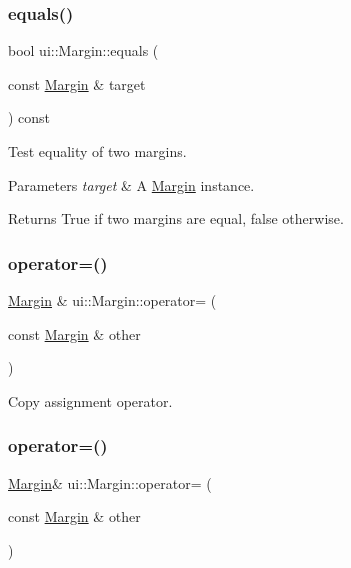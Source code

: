 \subsubsection{\texorpdfstring{equals()}{equals()}\hspace{0.1cm}{\footnotesize\ttfamily [2/2]}}
{\footnotesize\ttfamily bool ui\+::\+Margin\+::equals (\begin{DoxyParamCaption}\item[{const \hyperlink{classui_1_1Margin}{Margin} \&}]{target }\end{DoxyParamCaption}) const}

Test equality of two margins. 
\begin{DoxyParams}{Parameters}
{\em target} & A \hyperlink{classui_1_1Margin}{Margin} instance. \\
\hline
\end{DoxyParams}
\begin{DoxyReturn}{Returns}
True if two margins are equal, false otherwise. 
\end{DoxyReturn}
\mbox{\label{classui_1_1Margin_aa9b38e77be87eb7cecaf3be42619b6ff}} 
\subsubsection{\texorpdfstring{operator=()}{operator=()}\hspace{0.1cm}{\footnotesize\ttfamily [1/2]}}
{\footnotesize\ttfamily \hyperlink{classui_1_1Margin}{Margin} \& ui\+::\+Margin\+::operator= (\begin{DoxyParamCaption}\item[{const \hyperlink{classui_1_1Margin}{Margin} \&}]{other }\end{DoxyParamCaption})}

Copy assignment operator. \mbox{\label{classui_1_1Margin_a3e47b96ba1dfce60abbc81f0bc9d486e}} 
\subsubsection{\texorpdfstring{operator=()}{operator=()}\hspace{0.1cm}{\footnotesize\ttfamily [2/2]}}
{\footnotesize\ttfamily \hyperlink{classui_1_1Margin}{Margin}\& ui\+::\+Margin\+::operator= (\begin{DoxyParamCaption}\item[{const \hyperlink{classui_1_1Margin}{Margin} \&}]{other }\end{DoxyParamCaption})}

